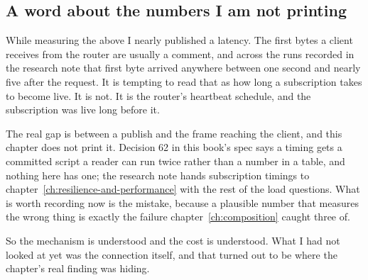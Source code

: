 \subsection*{A word about the numbers I am not printing}

%
While measuring the above I nearly published a latency. The first bytes a
client receives from the router are usually a  comment, and
across the runs recorded in the research note that first byte arrived anywhere
between one second and nearly five after the request. It is tempting to read
that as how long a subscription takes to become live. It is not. It is the
router's heartbeat schedule, and the subscription was live long before it.

The real gap is between a publish and the frame reaching the client, and this
chapter does not print it. Decision 62 in this book's spec says a timing gets a
committed script a reader can run twice rather than a number in a table, and
nothing here has one; the research note hands subscription timings to
chapter~\ref{ch:resilience-and-performance} with the rest of the load
questions. What is worth recording now is the mistake, because a plausible
number that measures the wrong thing is exactly the failure
chapter~\ref{ch:composition} caught three of.

\medskip
So the mechanism is understood and the cost is understood. What I had not
looked at yet was the connection itself, and that turned out to be where the
chapter's real finding was hiding.

%
